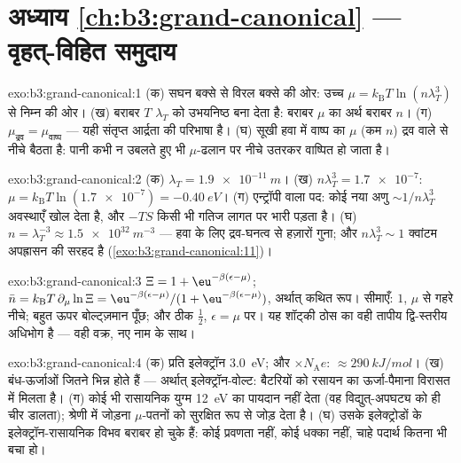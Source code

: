 \section*{अध्याय \ref{ch:b3:grand-canonical} --- वृहत्-विहित समुदाय}

\begin{solution}{exo:b3:grand-canonical:1}
(क) सघन बक्से से विरल बक्से की ओर: उच्च $\mu =
k_{\text{B}}T\ln(n\lambda_T^3)$ से निम्न की ओर। (ख) बराबर $T$
$\lambda_T$ को उभयनिष्ठ बना देता है: बराबर $\mu$ का अर्थ बराबर $n$। (ग)
$\mu_{\text{द्रव}} = \mu_{\text{वाष्प}}$ --- यही संतृप्त आर्द्रता
की परिभाषा है। (घ) सूखी हवा में वाष्प का $\mu$ (कम $n$)
द्रव वाले से नीचे बैठता है: पानी कभी न उबलते हुए भी $\mu$-ढलान
पर नीचे उतरकर वाष्पित हो जाता है।
\end{solution}

\begin{solution}{exo:b3:grand-canonical:2}
(क) $\lambda_T = \qty{1.9e-11}{m}$। (ख) $n\lambda_T^3 =
\num{1.7e-7}$: $\mu = k_{\text{B}}T\ln(\num{1.7e-7}) =
\qty{-0.40}{eV}$। (ग) एन्ट्रॉपी वाला पद: कोई नया अणु
$\sim1/n\lambda_T^3$ अवस्थाएँ खोल देता है, और $-TS$ किसी भी गतिज
लागत पर भारी पड़ता है।
(घ) $n = \lambda_T^{-3} \approx \qty{1.5e32}{m^{-3}}$ ---
हवा के लिए द्रव-घनत्व से हज़ारों गुना; और $n\lambda_T^3 \sim 1$
क्वांटम अपह्रासन की सरहद है
(\cref{exo:b3:grand-canonical:11})।
\end{solution}

\begin{solution}{exo:b3:grand-canonical:3}
$\Xi = 1 + \eu^{-\beta(\epsilon-\mu)}$; $\bar n = k_{\text{B}}T\,
\partial_\mu\ln\Xi = \eu^{-\beta(\epsilon-\mu)}/(1 +
\eu^{-\beta(\epsilon-\mu)})$, अर्थात् कथित रूप। सीमाएँ: $1$,
$\mu$ से गहरे नीचे; बहुत ऊपर बोल्ट्ज़मान पूँछ; और ठीक
$\tfrac12$, $\epsilon = \mu$ पर। यह शॉट्की ठोस का वही तापीय
द्वि-स्तरीय अधिभोग है --- वही वक्र, नए नाम के साथ।
\end{solution}

\begin{solution}{exo:b3:grand-canonical:4}
(क) प्रति इलेक्ट्रॉन \qty{3.0}{eV}; और $\times N_{\text{A}}e$:
$\approx\qty{290}{kJ/mol}$। (ख)  बंध-ऊर्जाओं जितने
भिन्न होते हैं --- अर्थात् इलेक्ट्रॉन-वोल्ट: बैटरियों को रसायन का
ऊर्जा-पैमाना विरासत में मिलता है। (ग) कोई भी रासायनिक युग्म
\qty{12}{eV} का पायदान नहीं देता (वह विद्युत्-अपघट्य को ही चीर
डालता); श्रेणी में जोड़ना $\mu$-पतनों को सुरक्षित रूप से जोड़ देता
है। (घ) उसके इलेक्ट्रोडों के इलेक्ट्रॉन-रासायनिक विभव बराबर हो चुके
हैं: कोई प्रवणता नहीं, कोई धक्का नहीं, चाहे पदार्थ कितना भी बचा हो।
\end{solution}

